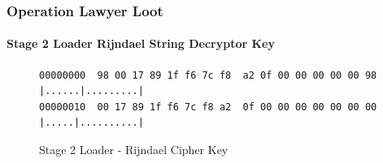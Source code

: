 \documentclass[aspectratio=169]{beamer}
\begin{document}
{
\begin{frame}[fragile]
  \frametitle{Operation Lawyer Loot}
  \framesubtitle{Stage 2 Loader Rijndael String Decryptor Key}
\begin{figure}
\small{
\begin{verbatim}
00000000  98 00 17 89 1f f6 7c f8  a2 0f 00 00 00 00 00 98  |......|.........|
00000010  00 17 89 1f f6 7c f8 a2  0f 00 00 00 00 00 00 00  |.....|..........|
\end{verbatim}
}
\caption{Stage 2 Loader - Rijndael Cipher Key}
\end{figure}
\end{frame}
}
\end{document}

